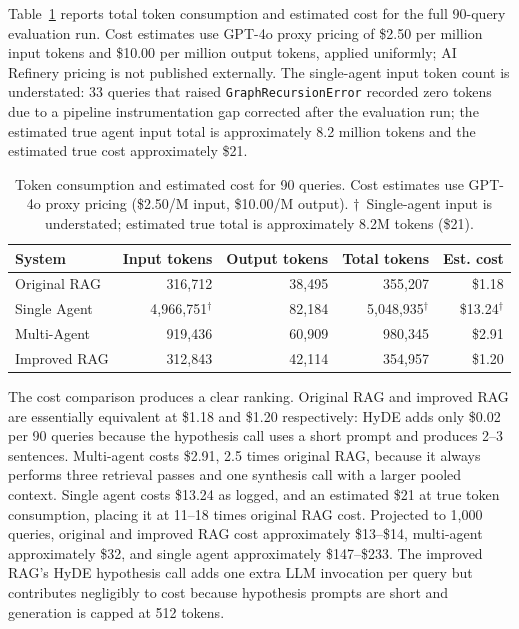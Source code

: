 Table~\ref{tab:cost} reports total token consumption and estimated cost for the full 90-query evaluation run. Cost estimates use GPT-4o proxy pricing of \$2.50 per million input tokens and \$10.00 per million output tokens, applied uniformly; AI Refinery pricing is not published externally. The single-agent input token count is understated: 33 queries that raised \texttt{GraphRecursionError} recorded zero tokens due to a pipeline instrumentation gap corrected after the evaluation run; the estimated true agent input total is approximately 8.2 million tokens and the estimated true cost approximately \$21.

\begin{table}[ht]
\centering
\caption{Token consumption and estimated cost for 90 queries. Cost estimates use GPT-4o proxy pricing (\$2.50/M input, \$10.00/M output). $\dagger$~Single-agent input is understated; estimated true total is approximately 8.2M tokens (\$21).}
\label{tab:cost}
\begin{tabular}{lrrrr}
\hline
\textbf{System} & \textbf{Input tokens} & \textbf{Output tokens} & \textbf{Total tokens} & \textbf{Est. cost} \\
\hline
Original RAG & 316,712   & 38,495  & 355,207   & \$1.18 \\
Single Agent & 4,966,751$^\dagger$ & 82,184 & 5,048,935$^\dagger$ & \$13.24$^\dagger$ \\
Multi-Agent  & 919,436   & 60,909  & 980,345   & \$2.91 \\
Improved RAG & 312,843   & 42,114  & 354,957   & \$1.20 \\
\hline
\end{tabular}
\end{table}

The cost comparison produces a clear ranking. Original RAG and improved RAG are essentially equivalent at \$1.18 and \$1.20 respectively: HyDE adds only \$0.02 per 90 queries because the hypothesis call uses a short prompt and produces 2--3 sentences. Multi-agent costs \$2.91, 2.5 times original RAG, because it always performs three retrieval passes and one synthesis call with a larger pooled context. Single agent costs \$13.24 as logged, and an estimated \$21 at true token consumption, placing it at 11--18 times original RAG cost. Projected to 1,000 queries, original and improved RAG cost approximately \$13--\$14, multi-agent approximately \$32, and single agent approximately \$147--\$233. The improved RAG's HyDE hypothesis call adds one extra LLM invocation per query but contributes negligibly to cost because hypothesis prompts are short and generation is capped at 512 tokens.


